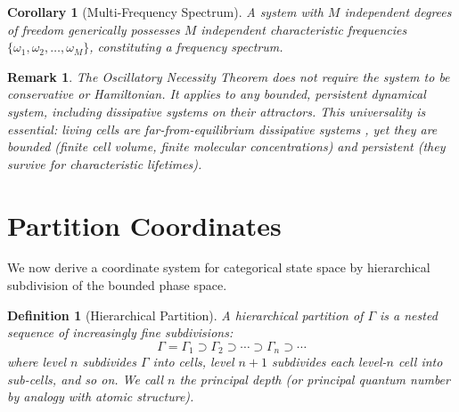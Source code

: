 \documentclass[11pt,twocolumn,a4paper]{article}
\newtheorem{corollary}[theorem]{Corollary}
\newtheorem{definition}[theorem]{Definition}
\newtheorem{remark}[theorem]{Remark}
\begin{document}
\begin{corollary}[Multi-Frequency Spectrum]
\label{cor:multifreq}
A system with $M$ independent degrees of freedom generically
possesses $M$ independent characteristic frequencies
$\{\omega_1, \omega_2, \ldots, \omega_M\}$, constituting a frequency
spectrum.
\end{corollary}

\begin{remark}
The Oscillatory Necessity Theorem does not require the system to be
conservative or Hamiltonian. It applies to any bounded, persistent
dynamical system, including dissipative systems on their attractors.
This universality is essential: living cells are far-from-equilibrium
dissipative systems \citep{prigogine1967,bertalanffy1950}, yet they
are bounded (finite cell volume, finite molecular concentrations) and
persistent (they survive for characteristic lifetimes).
\end{remark}


\section{Partition Coordinates}
\label{sec:partition}

We now derive a coordinate system for categorical state space by
hierarchical subdivision of the bounded phase space.

\begin{definition}[Hierarchical Partition]
\label{def:hierarchical-partition}
A hierarchical partition of $\Gamma$ is a nested sequence of
increasingly fine subdivisions:
\begin{equation}
\Gamma = \Gamma_1 \supset \Gamma_2 \supset \cdots \supset \Gamma_n
\supset \cdots
\end{equation}
where level $n$ subdivides $\Gamma$ into cells, level $n+1$ subdivides
each level-$n$ cell into sub-cells, and so on. We call $n$ the
\emph{principal depth} (or principal quantum number by analogy with
atomic structure).
\end{definition}
\end{document}
